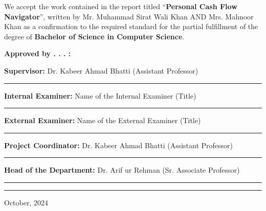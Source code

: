 \documentclass[12pt]{article}
\begin{document}
\vspace{1cm}

\noindent
We accept the work contained in the report titled “\textbf{Personal Cash Flow Navigator}”, written by Mr. Muhammad Sirat Wali Khan AND Mrs. Mahnoor Khan as a confirmation to the required standard for the partial fulfillment of the degree of \textbf{Bachelor of Science in Computer Science}.

\vspace{2cm}

\noindent
\textbf{Approved by . . . :}

\vspace{1cm}

\noindent
\textbf{Supervisor:} Dr. Kabeer Ahmad Bhatti (Assistant Professor) \\
\noindent\rule{8cm}{0.4pt}

\vspace{1cm}

\noindent
\textbf{Internal Examiner:} Name of the Internal Examiner (Title) \\
\noindent\rule{8cm}{0.4pt}

\vspace{1cm}

\noindent
\textbf{External Examiner:} Name of the External Examiner (Title) \\
\noindent\rule{8cm}{0.4pt}

\vspace{1cm}

\noindent
\textbf{Project Coordinator:} Dr. Kabeer Ahmad Bhatti (Assistant Professor) \\
\noindent\rule{8cm}{0.4pt}

\vspace{1cm}

\noindent
\textbf{Head of the Department:} Dr. Arif ur Rehman (Sr. Associate Professor) \\
\noindent\rule{8cm}{0.4pt}

\vspace{2cm}

\noindent\rule{8cm}{0.4pt}

\vspace{0.5cm}
\noindent
October, 2024

\newpage
\pagestyle{empty} %

\vspace*{8cm} %
\end{document}
